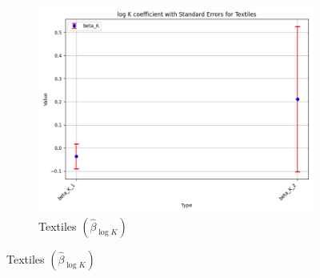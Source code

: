 \documentclass{article}
\begin{document}
\begin{figure}[ht!]
\begin{subfigure}[t]{0.32\textwidth}
        \centering
        \includegraphics[width=\textwidth]{figure/empirical_stat_normal_kmshare_ciiu_beta_logK_with_error_bars_Textiles.png}
        \caption{Textiles $(\hat{\beta}_{\log K})$}
    \end{subfigure}


\end{figure}
\end{document}
